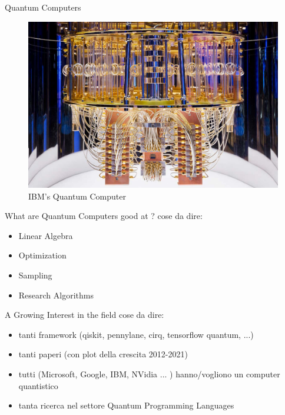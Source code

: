 \begin{frame}[fragile]{Quantum Computers}
	\begin{figure}[H]
	  \centering
	    \includegraphics[width=.8\linewidth]{quantum-computer}
	    \caption{IBM's Quantum Computer}
	\end{figure}
\end{frame}

\begin{frame}[fragile]{What are Quantum Computers good at ?}
	cose da dire: 
	\begin{itemize}
		\item Linear Algebra
		\item Optimization
		\item Sampling
		\item Research Algorithms
	\end{itemize}
\end{frame}

\begin{frame}[fragile]{A Growing Interest in the field}
	cose da dire: 
	\begin{itemize}
	 \item tanti framework (qiskit, pennylane, cirq, tensorflow quantum, ...)
	 \item  tanti paperi (con plot della crescita 2012-2021)
	 \item  tutti (Microsoft, Google, IBM, NVidia ... ) hanno/vogliono un computer quantistico
	 \item  tanta ricerca nel settore Quantum Programming Languages
	\end{itemize}
\end{frame}